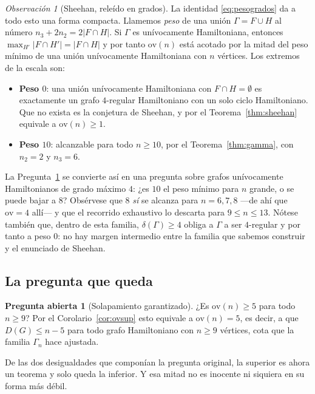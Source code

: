 \documentclass[11pt,a4paper]{article}
\theoremstyle{definition}
\newtheorem{pregunta}[teorema]{Pregunta abierta}
\theoremstyle{remark}
\newtheorem{observacion}[teorema]{Observación}
\begin{document}
\begin{observacion}[Sheehan, releído en grados]\label{obs:peso}
La identidad \eqref{eq:pesogrados} da a todo esto una forma compacta. Llamemos \emph{peso} de una unión $\Gamma=F\cup H$ al número $n_3+2n_2=2|F\cap H|$. Si $\Gamma$ es unívocamente Hamiltoniana, entonces $\max_{H'}|F\cap H'|=|F\cap H|$ y por tanto $\mathrm{ov}(n)$ está acotado por la mitad del peso mínimo de una unión unívocamente Hamiltoniana con $n$ vértices. Los extremos de la escala son:
\begin{itemize}
\item \textbf{Peso $0$}: una unión unívocamente Hamiltoniana con $F\cap H=\emptyset$ es exactamente un grafo $4$-regular Hamiltoniano con un solo ciclo Hamiltoniano. Que no exista es la conjetura de Sheehan, y por el Teorema~\ref{thm:sheehan} equivale a $\mathrm{ov}(n)\ge1$.
\item \textbf{Peso $10$}: alcanzable para todo $n\ge10$, por el Teorema~\ref{thm:gamma}, con $n_2=2$ y $n_3=6$.
\end{itemize}
La Pregunta~\ref{conj:ov} se convierte así en una pregunta sobre grafos unívocamente Hamiltonianos de grado máximo $4$: ¿es $10$ el peso mínimo para $n$ grande, o se puede bajar a $8$? Obsérvese que $8$ \emph{sí} se alcanza para $n=6,7,8$ —de ahí que $\mathrm{ov}=4$ allí— y que el recorrido exhaustivo lo descarta para $9\le n\le13$. Nótese también que, dentro de esta familia, $\delta(\Gamma)\ge4$ obliga a $\Gamma$ a ser $4$-regular y por tanto a peso $0$: no hay margen intermedio entre la familia que sabemos construir y el enunciado de Sheehan.
\end{observacion}


\subsection{La pregunta que queda}

\begin{pregunta}[Solapamiento garantizado]\label{conj:ov}
¿Es $\mathrm{ov}(n)\ge5$ para todo $n\ge9$? Por el Corolario~\ref{cor:ovsup} esto equivale a $\mathrm{ov}(n)=5$, es decir, a que $D(G)\le n-5$ para todo grafo Hamiltoniano con $n\ge9$ vértices, cota que la familia $\Gamma_n$ hace ajustada.
\end{pregunta}

De las dos desigualdades que componían la pregunta original, la superior es ahora un teorema y solo queda la inferior. Y esa mitad no es inocente ni siquiera en su forma más débil.
\end{document}
